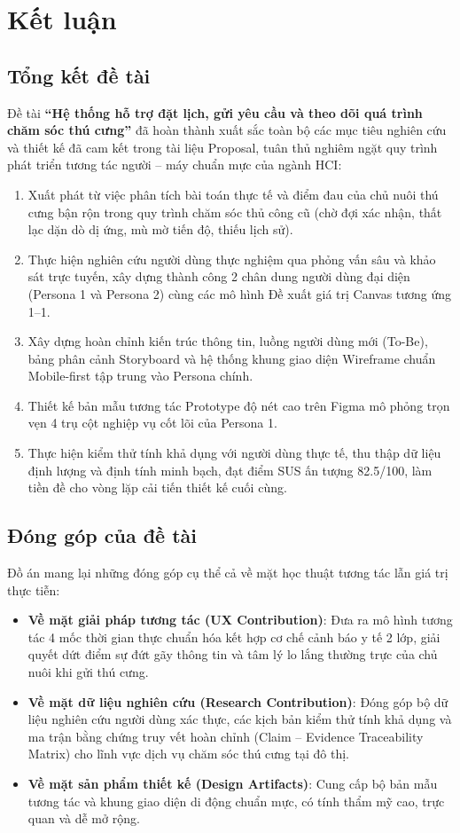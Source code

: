 \section{Kết luận}

\subsection{Tổng kết đề tài}
Đề tài \textbf{``Hệ thống hỗ trợ đặt lịch, gửi yêu cầu và theo dõi quá trình chăm sóc thú cưng''} đã hoàn thành xuất sắc toàn bộ các mục tiêu nghiên cứu và thiết kế đã cam kết trong tài liệu Proposal, tuân thủ nghiêm ngặt quy trình phát triển tương tác người -- máy chuẩn mực của ngành HCI:
\begin{enumerate}
    \item Xuất phát từ việc phân tích bài toán thực tế và điểm đau của chủ nuôi thú cưng bận rộn trong quy trình chăm sóc thủ công cũ (chờ đợi xác nhận, thất lạc dặn dò dị ứng, mù mờ tiến độ, thiếu lịch sử).
    \item Thực hiện nghiên cứu người dùng thực nghiệm qua phỏng vấn sâu và khảo sát trực tuyến, xây dựng thành công 2 chân dung người dùng đại diện (Persona 1 và Persona 2) cùng các mô hình Đề xuất giá trị Canvas tương ứng 1--1.
    \item Xây dựng hoàn chỉnh kiến trúc thông tin, luồng người dùng mới (To-Be), bảng phân cảnh Storyboard và hệ thống khung giao diện Wireframe chuẩn Mobile-first tập trung vào Persona chính.
    \item Thiết kế bản mẫu tương tác Prototype độ nét cao trên Figma mô phỏng trọn vẹn 4 trụ cột nghiệp vụ cốt lõi của Persona 1.
    \item Thực hiện kiểm thử tính khả dụng với người dùng thực tế, thu thập dữ liệu định lượng và định tính minh bạch, đạt điểm SUS ấn tượng 82.5/100, làm tiền đề cho vòng lặp cải tiến thiết kế cuối cùng.
\end{enumerate}

\subsection{Đóng góp của đề tài}
Đồ án mang lại những đóng góp cụ thể cả về mặt học thuật tương tác lẫn giá trị thực tiễn:
\begin{itemize}
    \item \textbf{Về mặt giải pháp tương tác (UX Contribution)}: Đưa ra mô hình tương tác 4 mốc thời gian thực chuẩn hóa kết hợp cơ chế cảnh báo y tế 2 lớp, giải quyết dứt điểm sự đứt gãy thông tin và tâm lý lo lắng thường trực của chủ nuôi khi gửi thú cưng.
    \item \textbf{Về mặt dữ liệu nghiên cứu (Research Contribution)}: Đóng góp bộ dữ liệu nghiên cứu người dùng xác thực, các kịch bản kiểm thử tính khả dụng và ma trận bằng chứng truy vết hoàn chỉnh (Claim -- Evidence Traceability Matrix) cho lĩnh vực dịch vụ chăm sóc thú cưng tại đô thị.
    \item \textbf{Về mặt sản phẩm thiết kế (Design Artifacts)}: Cung cấp bộ bản mẫu tương tác và khung giao diện di động chuẩn mực, có tính thẩm mỹ cao, trực quan và dễ mở rộng.
\end{itemize}

